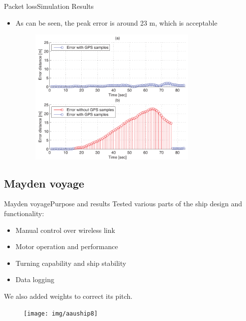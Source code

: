 
	\begin{frame}{Packet loss}{Simulation Results}
		\begin{itemize}
		  	\item As can be seen, the peak error is around 23 m, which is acceptable
			\begin{figure}
				\begin{center}
					\includegraphics[width=8.2cm]{img/error}
					\label{fig:error}
				\end{center}
			\end{figure}
		\end{itemize}
	\end{frame}


	\subsection{Mayden voyage}
	\begin{frame}{Mayden voyage}{Purpose and results}
	  Tested various parts of the ship design and functionality:
	  \begin{itemize}
	  	\item Manual control over wireless link
	  	\item Motor operation and performance
		\item Turning capability and ship stability
		\item Data logging
	  	\end{itemize}
	  	We also added weights to correct its pitch.
		\begin{figure}
			\begin{center}
				\texttt{[image: img/aauship8]}
				\label{fig:aauship}
			\end{center}
		\end{figure}
	\end{frame}

